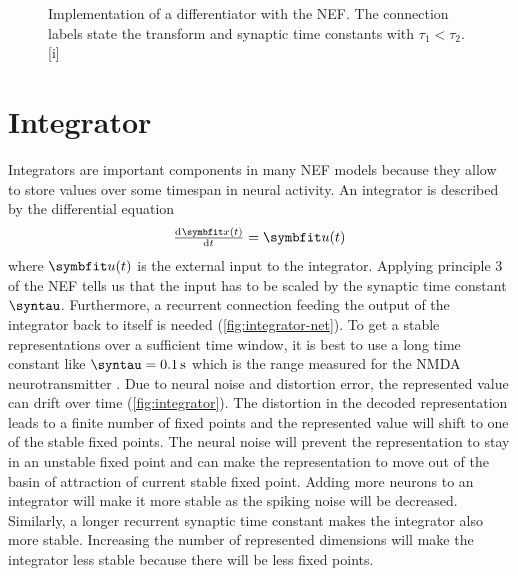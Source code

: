 \begin{figure}
    \begin{captionbeside}{Implementation of a differentiator with the NEF\@. The connection labels state the transform and synaptic time constants with $\tau_1 < \tau_2$.\label{fig:differentiator-net}}[i]
    \end{captionbeside}
\end{figure}


\section{Integrator}
Integrators are important components in many NEF models because they allow to store values over some timespan in neural activity.
An integrator is described by the differential equation
\begin{equation}
    \od{\vc x(t)}{t} = \vc u(t)
\end{equation}
where $\vc u(t)$ is the external input to the integrator.
Applying principle 3 of the NEF tells us that the input has to be scaled by the synaptic time constant $\syntau$.
Furthermore, a recurrent connection feeding the output of the integrator back to itself is needed (\cref{fig:integrator-net}).
To get a stable representations over a sufficient time window, it is best to use a long time constant like $\syntau = \SI{0.1}{\second}$ which is the range measured for the NMDA neurotransmitter \parencite{sah1990-1,moreno-bote2005}.
Due to neural noise and distortion error, the represented value can drift over time (\cref{fig:integrator}).
The distortion in the decoded representation leads to a finite number of fixed points and the represented value will shift to one of the stable fixed points.
The neural noise will prevent the representation to stay in an unstable fixed point and can make the representation to move out of the basin of attraction of current stable fixed point.
Adding more neurons to an integrator will make it more stable as the spiking noise will be decreased.
Similarly, a longer recurrent synaptic time constant makes the integrator also more stable.
Increasing the number of represented dimensions will make the integrator less stable because there will be less fixed points.
